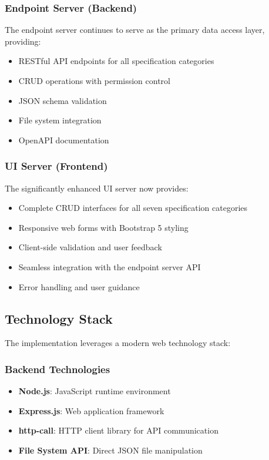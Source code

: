 \documentclass[11pt,a4paper]{article}
\begin{document}
\subsubsection{Endpoint Server (Backend)}
The endpoint server continues to serve as the primary data access layer, providing:
\begin{itemize}
    \item RESTful API endpoints for all specification categories
    \item CRUD operations with permission control
    \item JSON schema validation
    \item File system integration
    \item OpenAPI documentation
\end{itemize}

\subsubsection{UI Server (Frontend)}
The significantly enhanced UI server now provides:
\begin{itemize}
    \item Complete CRUD interfaces for all seven specification categories
    \item Responsive web forms with Bootstrap 5 styling
    \item Client-side validation and user feedback
    \item Seamless integration with the endpoint server API
    \item Error handling and user guidance
\end{itemize}

\subsection{Technology Stack}

The implementation leverages a modern web technology stack:

\subsubsection{Backend Technologies}
\begin{itemize}
    \item \textbf{Node.js}: JavaScript runtime environment
    \item \textbf{Express.js}: Web application framework
    \item \textbf{http-call}: HTTP client library for API communication
    \item \textbf{File System API}: Direct JSON file manipulation
\end{itemize}
\end{document}

